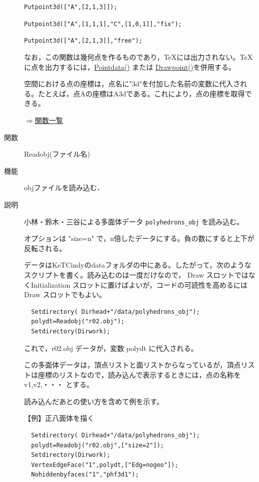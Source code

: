 \documentclass[papersize,a4paper,12pt,uplatex]{jsarticle}
\begin{document}
\begin{description}
    \verb|Putpoint3d(["A",[2,1,3]]);|
    
    \verb|Putpoint3d(["A",[1,1,1],"C",[1,0,1]],"fix");|
    
    \verb|Putpoint3d(["A",[2,1,3]],"free");|
    
\vspace{\baselineskip}
  なお，この関数は幾何点を作るものであり，TeXには出力されない。TeXに点を出力するには，\hyperlink{pointdata}{Pointdata()} または \hyperlink{drwpt}{Drawpoint()}を併用する。
  
  空間における点の座標は，点名に"3d"を付加した名前の変数に代入される。たとえば，点Aの座標はA3dである。これにより，点の座標を取得できる。

\begin{flushright} \hyperlink{functionlist}{$\Rightarrow$関数一覧}\end{flushright}

\vspace{\baselineskip}
\hypertarget{readobj}{}
\item[関数]  Readobj(ファイル名)
\item[機能]  objファイルを読み込む．
\item[説明]  小林・鈴木・三谷による多面体データ \verb|polyhedrons_obj|   を読み込む。

オプションは "size=n"  で，n倍したデータにする。負の数にすると上下が反転される。

データはKeTCindyのdataフォルダの中にある。したがって，次のようなスクリプトを書く。読み込むのは一度だけなので， Draw スロットではなくInitialization スロットに置けばよいが，コードの可読性を高めるには Draw スロットでもよい。
\begin{verbatim}
  Setdirectory( Dirhead+"/data/polyhedrons_obj");
  polydt=Readobj("r02.obj");
  Setdirectory(Dirwork);
\end{verbatim}
これで，r02.obj データが，変数 polydt に代入される。

この多面体データは，頂点リストと面リストからなっているが，頂点リストは座標のリストなので，読み込んで表示するときには，点の名称を v1,v2,・・・ とする。

読み込んだあとの使い方を含めて例を示す。

\vspace{\baselineskip}
【例】正八面体を描く
\begin{verbatim}
  Setdirectory( Dirhead+"/data/polyhedrons_obj");
  polydt=Readobj("r02.obj",["size=2"]);
  Setdirectory(Dirwork);
  VertexEdgeFace("1",polydt,["Edg=nogeo"]);
  Nohiddenbyfaces("1","phf3d1");
\end{verbatim}
      \begin{center}  \end{center}


\end{description}
\end{document}
